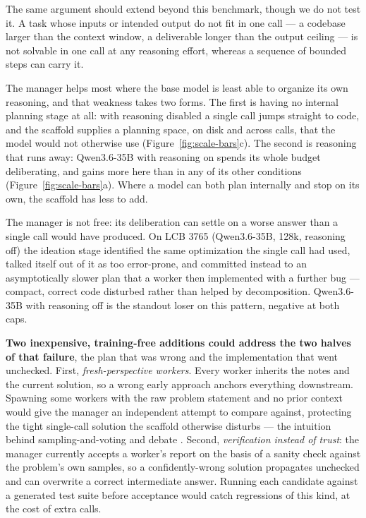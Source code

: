 \documentclass{article}
\begin{document}
The same argument should extend beyond this benchmark, though we do not test it. A task whose
inputs or intended output do not fit in one call --- a codebase larger than the context window,
a deliverable longer than the output ceiling --- is not solvable in one call at any reasoning
effort, whereas a sequence of bounded steps can carry it.

The manager helps most where the base model is least able to organize its own reasoning, and
that weakness takes two forms. The first is having no internal planning stage at all: with
reasoning disabled a single call jumps straight to code, and the scaffold supplies a planning
space, on disk and across calls, that the model would not otherwise use
(Figure~\ref{fig:scale-bars}c). The second is reasoning that runs away: Qwen3.6-35B with
reasoning on spends its whole budget deliberating, and gains more here than in any of its other
conditions (Figure~\ref{fig:scale-bars}a). Where a model can both plan internally and stop on
its own, the scaffold has less to add.

The manager is not free: its deliberation can settle on a worse answer than a single call would
have produced. On LCB 3765 (Qwen3.6-35B, 128k, reasoning off) the ideation stage identified the
same optimization the single call had used, talked itself out of it as too error-prone, and
committed instead to an asymptotically slower plan that a worker then implemented with a further
bug --- compact, correct code disturbed rather than helped by decomposition. Qwen3.6-35B with
reasoning off is the standout loser on this pattern, negative at both caps.

\textbf{Two inexpensive, training-free additions could address the two halves of that failure},
the plan that was wrong and the implementation that went unchecked. First,
\emph{fresh-perspective workers}. Every worker inherits the notes and the current solution, so a
wrong early approach anchors everything downstream. Spawning some workers with the raw problem
statement and no prior context would give the manager an independent attempt to compare against,
protecting the tight single-call solution the scaffold otherwise disturbs --- the intuition
behind sampling-and-voting and debate \citep{li2024,du2023}. Second, \emph{verification instead
of trust}: the manager currently accepts a worker's report on the basis of a sanity check against
the problem's own samples, so a confidently-wrong solution propagates unchecked and can overwrite
a correct intermediate answer. Running each candidate against a generated test suite before
acceptance would catch regressions of this kind, at the cost of extra calls.
\end{document}
